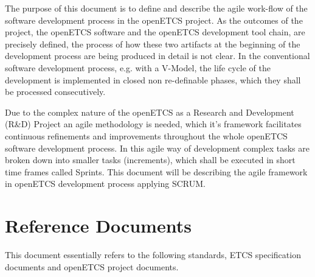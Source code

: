 The purpose of this document is to define and describe the agile work-flow of the software development process in the openETCS project. As the outcomes of the project, the openETCS software and the openETCS development tool chain, are precisely defined, the process of how these two artifacts at the beginning of the development process are being produced in detail is not clear. In the conventional software development  process, e.g. with a V-Model, the life cycle of the development is implemented in closed non re-definable phases, which they shall be processed consecutively. 

Due to the complex nature of the openETCS as a  Research and Development (R\&D) Project an agile methodology is needed, which it's framework facilitates continuous refinements and improvements throughout the whole openETCS software development process. In this agile way of development complex tasks are broken down into smaller tasks (increments), which shall be executed in short time frames called Sprints. This document will be describing the agile framework in openETCS development process applying SCRUM.








\section{Reference Documents}
\label{sec:refdoc}

This document essentially refers to the following standards, ETCS specification documents and openETCS project documents.


